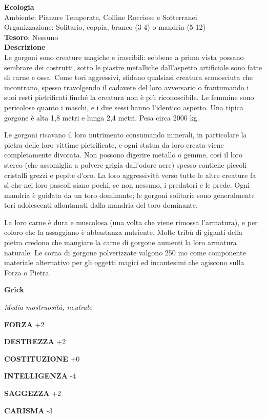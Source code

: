 \begin{multicols}{2}
\textbf{Ecologia}\\
Ambiente: Pianure Temperate, Colline Rocciose e Sotterranei\\
Organizzazione: Solitario, coppia, branco (3-4) o mandria (5-12)\\
\textbf{Tesoro}: Nessuno\\
\textbf{Descrizione}\\
Le gorgoni sono creature magiche e irascibili: sebbene a prima vista possano sembrare dei costrutti, sotto le piastre metalliche dall'aspetto artificiale sono fatte di carne e ossa. Come tori aggressivi, sfidano qualsiasi creatura sconosciuta che incontrano, spesso travolgendo il cadavere del loro avversario o frantumando i suoi resti pietrificati finché la creatura non è più riconoscibile. Le femmine sono pericolose quanto i maschi, e i due sessi hanno l'identico aspetto. Una tipica gorgone è alta 1,8 metri e lunga 2,4 metri. Pesa circa 2000 kg.

Le gorgoni ricavano il loro nutrimento consumando minerali, in particolare la pietra delle loro vittime pietrificate, e ogni statua da loro creata viene completamente divorata. Non possono digerire metallo o gemme, così il loro sterco (che assomiglia a polvere grigia dall'odore acre) spesso contiene piccoli cristalli grezzi e pepite d'oro. La loro aggressività verso tutte le altre creature fa sì che nei loro pascoli siano pochi, se non nessuno, i predatori e le prede. Ogni mandria è guidata da un toro dominante; le gorgoni solitarie sono generalmente tori adolescenti allontanati dalla mandria del toro dominante.

La loro carne è dura e muscolosa (una volta che viene rimossa l'armatura), e per coloro che la assaggiano è abbastanza nutriente. Molte tribù di giganti della pietra credono che mangiare la carne di gorgone aumenti la loro armatura naturale. Le corna di gorgone polverizzate valgono 250 mo come componente materiale alternativo per gli oggetti magici ed incantesimi che agiscono sulla Forza o Pietra.


\medskip{}\textbf{Grick}

\textit{Media mostruosità, neutrale}

\textbf{FORZA} +2

\textbf{DESTREZZA} +2

\textbf{COSTITUZIONE} +0

\textbf{INTELLIGENZA} -4

\textbf{SAGGEZZA} +2

\textbf{CARISMA} -3


\end{multicols}

